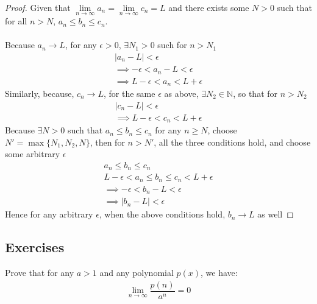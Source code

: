 \documentclass[12pt]{book}
\theoremstyle{definition}
\begin{document}
\begin{proof}
Given that $\lim\limits_{n\to \infty} a_n = \lim\limits_{n\to \infty} c_n = L$ and there exists some $N > 0$ such that for all $n>N$, $a_n \leq b_n \leq c_n$.
\\
\\
Because $a_n \to L$, for any $\epsilon >0$, $\exists N_1 > 0$ such for $n>N_1$
\begin{align*}
|a_n-L| < \epsilon \\
\implies -\epsilon <a_n-L< \epsilon\\
\implies L - \epsilon < a_n < L +\epsilon
\end{align*}
Similarly, because, $c_n \to L$, for the same $\epsilon$ as above, $\exists N_2 \in \mathbb{N}$, so that for $n>N_2$
\begin{align*}
|c_n-L| < \epsilon\\
\implies L-\epsilon < c_n < L+ \epsilon	
\end{align*}
Because $\exists N > 0$ such that $a_n\leq b_n \leq c_n$ for any $n \geq N$, choose $N' = \max\{N_1,N_2,N\}$, then for $n> N'$, all the three conditions hold, and choose some arbitrary $\epsilon$
\begin{gather*}
	a_n\leq b_n \leq c_n \\
	L-\epsilon < a_n \leq b_n \leq c_n < L + \epsilon\\
	\implies -\epsilon <b_n -L < \epsilon \\
	\implies |b_n -L| < \epsilon
\end{gather*}
Hence for any arbitrary $\epsilon$, when the above conditions hold, $b_n \to L$ as well

\end{proof}




\subsection{Exercises}


\begin{ex}{1.12} 
Prove that for any $a > 1$ and any polynomial $p(x)$, we have:
\begin{align*}
\lim\limits_{n \to \infty} \dfrac{p(n)}{a^n} =0	
\end{align*}
\end{ex}
\end{document}
